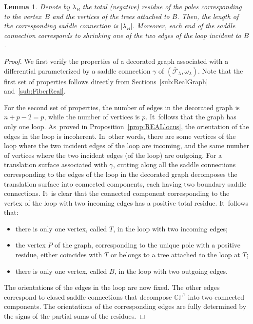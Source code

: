 \documentclass[JEP,XML,SOM,Unicode,NoFloatCountersInSection,published]{cedram}
\newtheorem{lem}[thm]{Lemma}
\theoremstyle{definition}
\begin{document}
\begin{lem}
Denote by $\lambda_{B}$ the total (negative) residue of the poles corresponding to the vertex~$B$ and the vertices of the trees attached to $B$. Then, the length of the corresponding saddle connection is $|\lambda_{B}|$. Moreover, each end of the saddle connection corresponds to shrinking one of the two edges of the loop incident to $B$.
\end{lem}

\begin{proof}
We first verify the properties of a decorated graph associated with a differential parameterized by a saddle connection $\gamma$ of $(\overline{\mathcal{F}}_{\lambda}, \omega_\lambda)$. Note that the first set of properties follows directly from Sections~\ref{sub:RealGraph} and~\ref{sub:FiberReal}.

For the second set of properties, the number of edges in the decorated graph is $n+p-2=p$, while the number of vertices is $p$. It~follows that the graph has only one loop. As~proved in Proposition~\ref{prop:REALlocus}, the orientation of the edges in the loop is incoherent. In~other words, there are some vertices of the loop where the two incident edges of the loop are incoming, and the same number of vertices where the two incident edges (of the loop) are outgoing. For a translation surface associated with $\gamma$, cutting along all the saddle connections corresponding to the edges of the loop in the decorated graph decomposes the translation surface into connected components, each having two boundary saddle connections. It~is clear that the connected component corresponding to the vertex of the loop with two incoming edges has a positive total residue. It~follows that:
\begin{itemize}
\item there is only one vertex, called $T$, in the loop with two incoming edges;
\item the vertex $P$ of the graph, corresponding to the unique pole with a positive residue, either coincides with $T$ or belongs to a tree attached to the loop at $T$;
\item there is only one vertex, called $B$, in the loop with two outgoing edges.
\end{itemize}
The orientations of the edges in the loop are now fixed. The other edges correspond to closed saddle connections that decompose $\mathbb{CP}^{1}$ into two connected components. The orientations of the corresponding edges are fully determined by the signs of the partial sums of the residues.


\end{proof}
\end{document}
